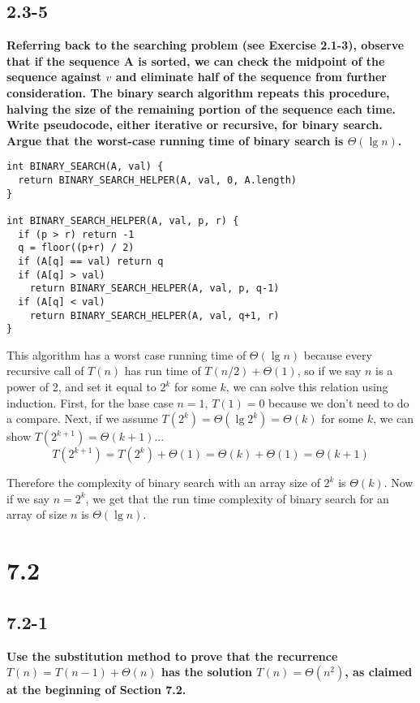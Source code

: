\documentclass[11pt]{article}
\begin{document}
 \newpage

 \subsection*{2.3-5}
 \textbf{Referring back to the searching problem (see Exercise 2.1-3), observe that if the sequence 
 A is sorted, we can check the midpoint of the sequence against $v$ and eliminate half of the sequence 
 from further consideration. The binary search algorithm repeats this procedure, halving the size of 
 the remaining portion of the sequence each time. Write pseudocode, either iterative or recursive, 
 for binary search. Argue that the worst-case running time of binary search is $\Theta (\lg n)$.}

 \begin{verbatim}
int BINARY_SEARCH(A, val) {
  return BINARY_SEARCH_HELPER(A, val, 0, A.length)
}

int BINARY_SEARCH_HELPER(A, val, p, r) {
  if (p > r) return -1
  q = floor((p+r) / 2)
  if (A[q] == val) return q 
  if (A[q] > val) 
    return BINARY_SEARCH_HELPER(A, val, p, q-1)
  if (A[q] < val) 
    return BINARY_SEARCH_HELPER(A, val, q+1, r)
}\end{verbatim}
 This algorithm has a worst case running time of $\Theta(\lg n)$ because every recursive call of $T(n)$ 
 has run time of $T(n/2) + \Theta(1)$, so if we say $n$ is a power of 2, and set it equal to $2^k$ for some $k$, 
 we can solve this relation using induction.  First, for the base case $n=1$, $T(1) = 0$ because we don't 
 need to do a compare.  Next, if we assume $T(2^k) = \Theta(\lg 2^k) = \Theta(k)$ for some $k$, we can show $
 T(2^{k+1}) = \Theta(k+1)$...
 $$T(2^{k+1}) = T(2^k) + \Theta(1) = \Theta(k) + \Theta(1) = \Theta(k+1)$$

 Therefore the complexity of binary search with an array size of $2^k$ is $\Theta (k)$.  Now if we say 
 $n = 2^k$, we get that the run time complexity of binary search for an array of size $n$ is $\Theta (\lg n)$.

 \section*{7.2}

 \subsection*{7.2-1}
 \textbf{Use the substitution method to prove that the recurrence $T(n) = T(n-1) + \Theta (n)$ has the
 solution $T(n) = \Theta (n^2)$, as claimed at the beginning of Section 7.2.} \\
\end{document}
